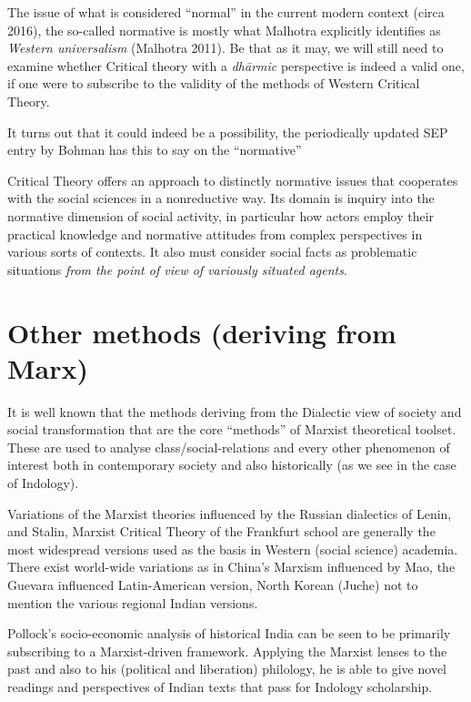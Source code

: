 The issue of what is considered ``normal'' in the current modern context (circa 2016), the so-called normative is mostly what Malhotra explicitly identifies as {\sl Western universalism} (Malhotra 2011). Be that as it may, we will still need to examine whether Critical theory with a {\sl dhārmic} perspective is indeed a valid one, if one were to subscribe to the validity of the methods of Western Critical Theory.

It turns out that it could indeed be a possibility, the periodically updated SEP entry by Bohman has this to say on the ``normative''
\begin{myquote}
Critical Theory offers an approach to distinctly normative issues that cooperates with the social sciences in a nonreductive way. Its domain is inquiry into the normative dimension of social activity, in particular how actors employ their practical knowledge and normative attitudes from complex perspectives in various sorts of contexts. It also must consider social facts as problematic situations {{\sl from the point of view of variously situated agents}\relax}.
\end{myquote}

\newpage

\section*{Other methods (deriving from Marx)}

It is well known that the methods deriving  from the Dialectic view of society and social transformation that are the core ``methods'' of Marxist theoretical toolset. These are used to analyse class/social-relations and every other phenomenon of interest both in contemporary society and also historically (as we see in the case of Indology).

Variations of the Marxist theories influenced by the Russian dialectics of Lenin, and Stalin, Marxist Critical Theory of the Frankfurt school are generally the most widespread versions used as the basis in Western (social science) academia. There exist world-wide variations as in China's Marxism influenced by Mao, the Guevara influenced Latin-American version, North Korean (Juche) not to mention the various regional Indian versions.

Pollock's socio-economic analysis of historical India can be seen to be primarily subscribing to a Marxist-driven framework. Applying the Marxist lenses to the past and also to his (political and liberation) philology, he is able to give novel readings and perspectives of Indian texts that pass for Indology scholarship.

